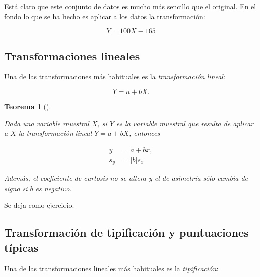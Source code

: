 \documentclass[
  spanish,
  a4paper,
]{scrreport}
\theoremstyle{plain}
\newtheorem{theorem}{Teorema}[chapter]
\theoremstyle{definition}
\theoremstyle{definition}
\theoremstyle{remark}
\begin{document}
Está claro que este conjunto de datos es mucho más sencillo que el
original. En el fondo lo que se ha hecho es aplicar a los datos la
transformación:

\[Y= 100X-165\]

\subsection{Transformaciones lineales}\label{transformaciones-lineales}

Una de las transformaciones más habituales es la \emph{transformación
lineal}:

\[Y=a+bX.\]

\begin{theorem}[]\protect\hypertarget{thm-transformaciones-lineales}{}\label{thm-transformaciones-lineales}

Dada una variable muestral \(X\), si \(Y\) es la variable muestral que
resulta de aplicar a \(X\) la transformación lineal \(Y=a+bX\), entonces

\begin{align*}
\bar y &= a+ b\bar x,\\
s_{y} &= |b|s_{x}
\end{align*}

Además, el coeficiente de curtosis no se altera y el de asimetría sólo
cambia de signo si \(b\) es negativo.

\end{theorem}

\begin{tcolorbox}[enhanced jigsaw, arc=.35mm, bottomrule=.15mm, bottomtitle=1mm, breakable, colback=white, colbacktitle=quarto-callout-note-color!10!white, colframe=quarto-callout-note-color-frame, coltitle=black, left=2mm, leftrule=.75mm, opacityback=0, opacitybacktitle=0.6, rightrule=.15mm, title=\textcolor{quarto-callout-note-color}{\faInfo}\hspace{0.5em}{Demostración}, titlerule=0mm, toprule=.15mm, toptitle=1mm]

Se deja como ejercicio.

\end{tcolorbox}

\subsection{Transformación de tipificación y puntuaciones
típicas}\label{transformaciuxf3n-de-tipificaciuxf3n-y-puntuaciones-tuxedpicas}

Una de las transformaciones lineales más habituales es la
\emph{tipificación}:
\end{document}
